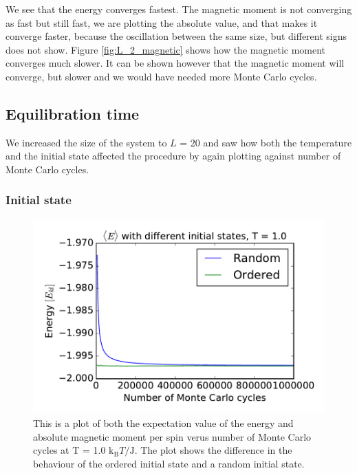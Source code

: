 We see that the energy converges fastest. The magnetic moment is not converging as fast but still fast, we are plotting the absolute value, and that makes it converge faster, because the oscillation between the same size, but different signs does not show. Figure \ref{fig:L_2_magnetic} shows how the magnetic moment converges much slower. It can be shown however that the magnetic moment will converge, but slower and we would have needed more Monte Carlo cycles. 

\subsection{Equilibration time}

We increased the size of the system to $L$ = 20 and saw how both the temperature and the initial state affected the procedure by again plotting against number of Monte Carlo cycles. %


\subsubsection{Initial state}

\begin{figure}[H]
\includegraphics[width=\linewidth]{../results/4c/ran_order_T1}\caption{This is a plot of both the expectation value of the energy and absolute magnetic moment per spin verus number of Monte Carlo cycles at T = 1.0 $\text{k}_\text{B}T/\text{J}$. The plot shows the difference in the behaviour of the ordered initial state and a random initial state.}\label{fig:L_20_initial_T_1.0}
\end{figure}

